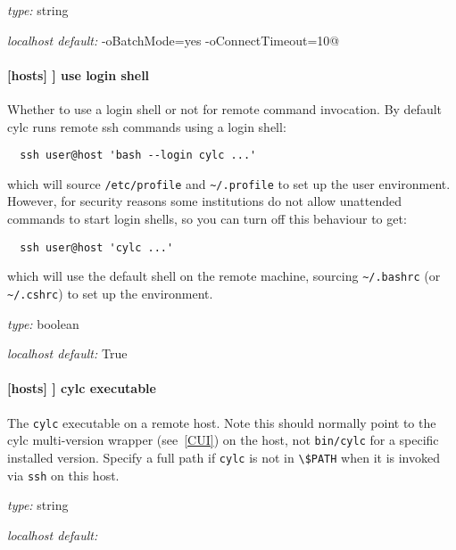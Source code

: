 \begin{myitemize}
\item {\em type:} string
\item {\em localhost default:} \lstinline@ssh -oBatchMode=yes -oConnectTimeout=10@
\end{myitemize}

\paragraph[use login shell]{[hosts] \textrightarrow [[HOST]] \textrightarrow use login shell }

Whether to use a login shell or not for remote command invocation. By
default cylc runs remote ssh commands using a login shell:
\begin{lstlisting}
  ssh user@host 'bash --login cylc ...'
\end{lstlisting}
which will source \lstinline=/etc/profile= and
\lstinline=~/.profile= to set up the user environment.  However, for
security reasons some institutions do not allow unattended commands to
start login shells, so you can turn off this behaviour to get:
\begin{lstlisting}
  ssh user@host 'cylc ...'
\end{lstlisting}
which will use the default shell on the remote machine,
sourcing \lstinline=~/.bashrc= (or \lstinline=~/.cshrc=) to set up the
environment.

\begin{myitemize}
\item {\em type:} boolean
\item {\em localhost default:} True
\end{myitemize}

\paragraph[cylc executable]{[hosts] \textrightarrow [[HOST]] \textrightarrow cylc executable }

The \lstinline=cylc= executable on a remote host. Note this should normally
point to the cylc multi-version wrapper (see~\ref{CUI}) on the host, not
\lstinline=bin/cylc= for a specific installed version.
Specify a full path if \lstinline=cylc= is not in \lstinline=\$PATH= when it is
invoked via \lstinline=ssh= on this host.

\begin{myitemize}
\item {\em type:} string
\item {\em localhost default:} \lstinline@cylc@
\end{myitemize}

